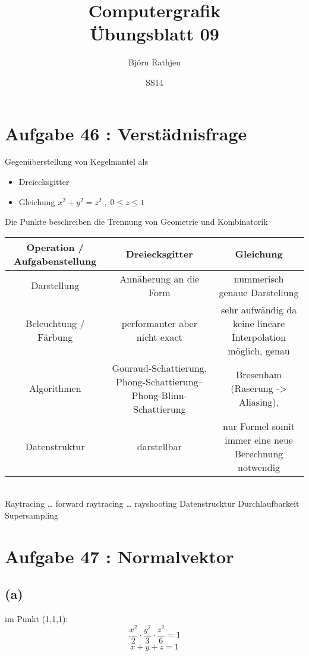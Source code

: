 \documentclass[11pt]{article}
\title{Computergrafik\\Übungsblatt 09}
\author{Björn Rathjen}
\date{SS14}
\begin{document}
\maketitle
\newpage
\section{Aufgabe 46 : Verstädnisfrage}
Gegenüberstellung von Kegelmantel als
\begin{itemize}
\item Dreiecksgitter
\item Gleichung $x^2 + y^2 = z^2 \; , \; 0\leq z \leq 1$ 
\end{itemize}
Die Punkte beschreiben die Trennung von Geometrie und Kombinatorik\\

\begin{tabular}{c|c|c}
Operation / Aufgabenstellung &
Dreiecksgitter &
Gleichung \\ \hline
 
Darstellung & 
Annäherung an die Form &
nummerisch genaue Darstellung \\ \hline 

Beleuchtung / Färbung & 
\begin{minipage}[c]{5cm} performanter aber nicht exact \end{minipage} &
\begin{minipage}[c]{5cm} sehr aufwändig da keine lineare Interpolation möglich, genau \end{minipage} \hspace{0.3cm}\\ \hline  

Algorithmen &
\hspace{0.3cm }\begin{minipage}[c]{5cm} Gouraud-Schattierung, Phong-Schattierung– Phong-Blinn-Schattierung \end{minipage}& 
Bresenham (Raserung -> Aliasing),\\ \hline \hspace{0.3cm}

Datenstruktur &
darstellbar &
nur Formel somit immer eine neue Berechnung notwendig \\

\end{tabular}\\
Raytracing … forward raytracing … rayshooting 
Datenstrucktur Durchlaufbarkeit
Supersampling \\

\section{Aufgabe 47 : Normalvektor}
\subsection{(a)} 
im Punkt (1,1,1):
$$ \frac{x^2}{2} \cdot \frac{y^2}{3} \cdot \frac{z^2}{6} = 1$$
$$ x + y + z = 1$$
\end{document}
